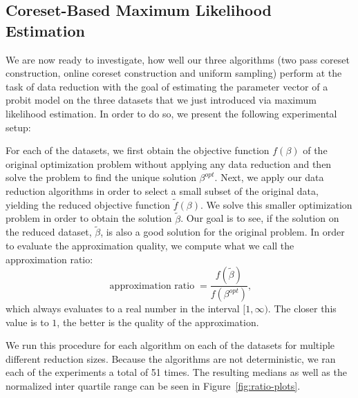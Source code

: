 \subsection{Coreset-Based Maximum Likelihood Estimation}

We are now ready to investigate, how well our three algorithms
(two pass coreset construction, online coreset construction and
uniform sampling) perform at the task of data reduction
with the goal of estimating the
parameter vector of a probit model on the three datasets that
we just introduced via maximum likelihood estimation.
In order to do so, we present the following experimental setup:

For each of the datasets, we first obtain the objective function
$f(\beta)$ of the original optimization problem without applying
any data reduction and then solve the problem to find the
unique solution $\beta^{opt}$.
Next, we apply our data reduction algorithms in order to select
a small subset of the original data, yielding the reduced
objective function $\tilde{f}(\beta)$. We solve this
smaller optimization problem in order to obtain the solution
$\tilde{\beta}$. Our goal is to see, if the solution on the
reduced dataset, $\tilde{\beta}$, is also a good solution
for the original problem. In order to evaluate the approximation
quality, we compute what we call the approximation ratio:
\begin{equation*}
    \operatorname{approximation\ ratio} = \frac{f(\tilde{\beta})}{f(\beta^{opt})},
\end{equation*}
which always evaluates to a real number in the interval $[1, \infty)$.
The closer this value is to $1$, the better is the quality of
the approximation.

We run this procedure for each algorithm on each of the datasets
for multiple different reduction sizes. Because the algorithms
are not deterministic, we ran each of the experiments a total
of 51 times. The resulting medians as well as the normalized
inter quartile range can be seen in Figure~\ref{fig:ratio-plots}.

